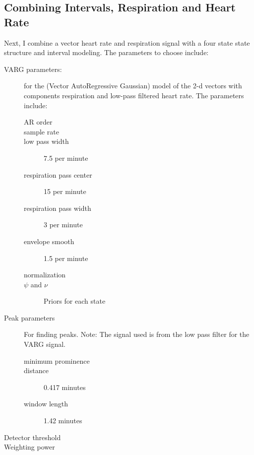 \documentclass[12pt]{article}
\begin{document}
{\begin{figure}
  \centering
  \label{fig:#1_rw_study}
\end{figure}

\begin{figure}
  \centering
  \label{fig:#1_rs_study}
\end{figure}

}

\subsection{Combining Intervals, Respiration and Heart Rate}
\label{sec:combination}

Next, I combine a vector heart rate and respiration signal with a four
state state structure and interval modeling.  The parameters to choose
include:
\begin{description}
\item[VARG parameters:] for the (Vector AutoRegressive Gaussian) model
  of the 2-d vectors with components respiration and low-pass filtered
  heart rate.  The parameters include:
  \begin{description}
  \item[AR order] %
  \item[sample rate] %
  \item[low pass width] 7.5 per minute %
  \item[respiration pass center] 15 per minute %
  \item[respiration pass width] 3 per minute %
  \item[envelope smooth] 1.5 per minute %
  \item[normalization] 
  \item[$\psi$ and $\nu$] Priors for each state
  \end{description}
\item[Peak parameters] For finding peaks.  Note: The signal used is
  from the low pass filter for the VARG signal.
  \begin{description}
  \item[minimum prominence] 
  \item[distance] 0.417 minutes
  \item[window length] 1.42 minutes
  \end{description}
\item[Detector threshold] 
\item[Weighting power] 
\end{description}

\end{document}
